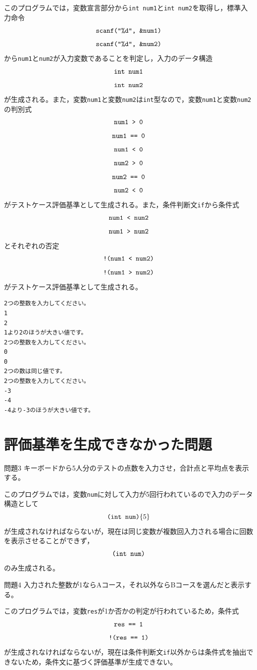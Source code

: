 \documentclass{tpu-sotu}
\begin{document}

このプログラムでは，変数宣言部分から{\tt int num1}と{\tt int num2}を取得し，標準入力命令\\
\[ 
\mbox{{\tt {scanf("\%d", \&num1)}}}
\]
\[ 
\mbox{{\tt {scanf("\%d", \&num2)}}}
\]
から{\tt num1}と{\tt num2}が入力変数であることを判定し，入力のデータ構造\\
\[
\mbox{{\tt int num1}}
\]
\[
\mbox{{\tt int num2}}
\]
が生成される。また，変数{\tt num1}と変数{\tt num2}は{\tt int}型なので，変数{\tt num1}と変数{\tt num2}の判別式\\
\[ 
\mbox{\tt{num1 > 0}} 
\]
\[
\mbox{\tt{num1 == 0}}
\]
\[
\mbox{\tt{num1 < 0}}
\]
\[ 
\mbox{\tt{num2 > 0}} 
\]
\[
\mbox{\tt{num2 == 0}}
\]
\[
\mbox{\tt{num2 < 0}}
\]
がテストケース評価基準として生成される。また，条件判断文{\tt if}から条件式\\
\[
\mbox{\tt{num1 < num2}}
\]
\[
\mbox{\tt{num1 > num2}}
\]
とそれぞれの否定\\
\[
\mbox{\tt{!(num1 < num2)}}
\]
\[
\mbox{\tt{!(num1 > num2)}}
\]
がテストケース評価基準として生成される。

\begin{lstlisting}[xleftmargin=1cm]
2つの整数を入力してください。
1
2
1より2のほうが大きい値です。
2つの整数を入力してください。
0
0
2つの数は同じ値です。
2つの整数を入力してください。
-3
-4
-4より-3のほうが大きい値です。

\end{lstlisting}

\section{評価基準を生成できなかった問題}
\begin{itembox}[l]{問題3}
キーボードから5人分のテストの点数を入力させ，合計点と平均点を表示する。
\end{itembox}

このプログラムでは，変数{\tt num}に対して入力が5回行われているので入力のデータ構造として
\[
\mbox{{\tt (int num)}\{5\}}
\]
が生成されなければならないが，現在は同じ変数が複数回入力される場合に回数を表示させることができず，
\[
\mbox{{\tt (int num)}}
\]
のみ生成される。
\begin{itembox}[l]{問題4}
入力された整数が1ならAコース，それ以外ならBコースを選んだと表示する。
\end{itembox}

このプログラムでは，変数{\tt res}が1か否かの判定が行われているため，条件式
\[
\mbox{\tt{res == 1}}
\]
\[
\mbox{\tt{!(res == 1)}}
\]
が生成されなければならないが，現在は条件判断文{\tt if}以外からは条件式を抽出できないため，条件文に基づく評価基準が生成できない。
\end{document}
